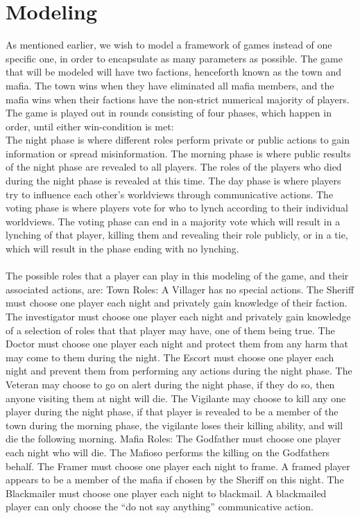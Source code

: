 \section{Modeling}
As mentioned earlier, we wish to model a framework of games instead of one
specific one, in order to encapsulate as many parameters as possible. The game
that will be modeled will have two factions, henceforth known as the town and
mafia. The town wins when they have eliminated all mafia members, and the mafia
wins when their factions have the non-strict numerical majority of players. The
game is played out in rounds consisting of four phases, which happen in order,
until either win-condition is met: \\ The night phase is where different roles
perform private or public actions to gain information or spread misinformation.
The morning phase is where public results of the night phase are revealed to
all players. The roles of the players who died during the night phase is revealed at
this time. The day phase is where players try to influence each other's
worldviews through communicative actions. The voting phase is where players
vote for who to lynch according to their individual worldviews. The voting
phase can end in a majority vote which will result in a lynching of that
player, killing them and revealing their role publicly, or in a tie, which will
result in the phase ending with no lynching. \\ \\ The possible roles that a player
can play in this modeling of the game, and their associated actions, are: Town
Roles: A Villager has no special actions. The Sheriff must choose one player
each night and privately gain knowledge of their faction. The investigator must choose one
player each night and privately gain knowledge of a selection of roles that that player
may have, one of them being true. The Doctor must choose one player each night
and protect them from any harm that may come to them during the night. The
Escort must choose one player each night and prevent them from performing any
actions during the night phase. The Veteran may choose to go on alert during
the night phase, if they do so, then anyone visiting them at night will die.
The Vigilante may choose to kill any one player during the night phase, if that
player is revealed to be a member of the town during the morning phase, the
vigilante loses their killing ability, and will die the following morning.
Mafia Roles: The Godfather must choose one player each night who will die. The
Mafioso performs the killing on the Godfathers behalf. The Framer must choose
one player each night to frame. A framed player appears to be a member of the
mafia if chosen by the Sheriff on this night. The Blackmailer must choose one
player each night to blackmail. A blackmailed player can only choose the “do
not say anything” communicative action.

